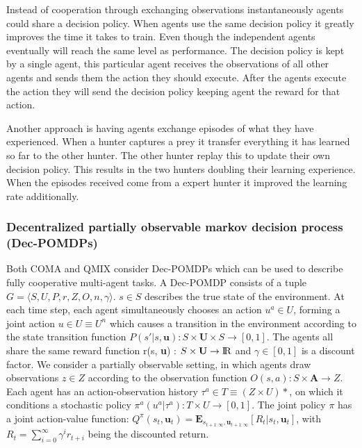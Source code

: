 Instead of cooperation through exchanging observations instantaneously agents could share a decision policy. When agents use the same decision policy it greatly improves the time it takes to train. Even though the independent agents eventually will reach the same level as performance. The decision policy is kept by a single agent, this particular agent receives the observations of all other agents and sends them the action they should execute. After the agents execute the action they will send the decision policy keeping agent the reward for that action.

Another approach is having agents exchange episodes of what they have experienced. When a hunter captures a prey it transfer everything it has learned so far to the other hunter. The other hunter replay this to update their own decision policy. This results in the two hunters doubling their learning experience. When the episodes received come from a expert hunter it improved the learning rate additionally.

\subsubsection{Decentralized partially observable markov decision process (Dec-POMDPs)\citep{oliehoek2016concise}}

Both COMA and QMIX consider Dec-POMDPs which can be used to describe fully cooperative multi-agent tasks. A Dec-POMDP consists of a tuple $G = \langle S,U,P,r,Z,O,n, \gamma  \rangle$. $s \in S$ describes the true state of the environment. At each time step, each agent simultaneously chooses an action $u^{a} \in U$, forming a joint action $u \in U \equiv U^{n}$ which causes a transition in the environment according  to  the  state  transition  function
$P(s'|s, \textbf{u}) : S \times \textbf{U} \times S \rightarrow [0,1]$. The agents all share the same reward function r(s, \textbf{u}) :  $S \times \textbf{U} \rightarrow {\rm I\!R}$ and $\gamma \in [0,1]$ is a discount factor.
\newline
\newline
We  consider  a  partially  observable  setting,  in  which agents  draw  observations $z \in Z$ according  to  the  observation function $O(s,a) : S \times \textbf{A} \rightarrow Z$. Each agent has an action-observation history $\tau^{a} \in T \equiv (Z \times U)*$, on which it conditions a stochastic policy $\pi^{a}(u^{a}|\tau^{a}) : T \times U \rightarrow [0,1]$. The joint policy $\pi$ has a joint action-value function: $Q^{\pi}\left(s_{t}, \mathbf{u}_{t}\right) = \mathbf{E}_{s_{t+1 : \infty}, \mathbf{u}_{t+1 : \infty}}\left[R_{t} | s_{t}, \mathbf{u}_{t}\right]$, with $R_{t}=\sum_{i=0}^{\infty} \gamma^{i} r_{t+i}$ being the discounted return.


